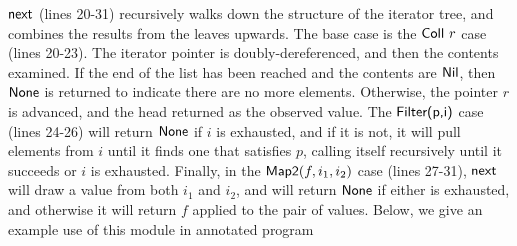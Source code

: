 \documentclass[preprint,natbib]{sigplanconf}
\begin{document}
$\mbox{\textsf{{next}}}$ (lines 20-31) recursively walks down the structure of
the iterator tree, and combines the results from the leaves upwards.
The base case is the $\mbox{\textsf{{Coll }}}r$ case (lines 20-23). The iterator
pointer is doubly-dereferenced, and then the contents examined. If the
end of the list has been reached and the contents are $\mbox{\textsf{{Nil}}}$,
then $\mbox{\textsf{{None}}}$ is returned to indicate there are no more
elements. Otherwise, the pointer $r$ is advanced, and the head
returned as the observed value. The $\mbox{\textsf{{Filter(p,i)}}}$ case (lines
24-26) will return $\mbox{\textsf{{None}}}$ if $i$ is exhausted, and if it is
not, it will pull elements from $i$ until it finds one that satisfies
$p$, calling itself recursively until it succeeds or $i$ is exhausted.
Finally, in the $\mbox{\textsf{{Map2}}}(f, i_1, i_2)$ case (lines 27-31),
$\mbox{\textsf{{next}}}$ will draw a value from both $i_1$ and $i_2$, and will
return $\mbox{\textsf{{None}}}$ if either is exhausted, and otherwise it will
return $f$ applied to the pair of values.
%
Below, we give an example use of this module in annotated program
\end{document}

